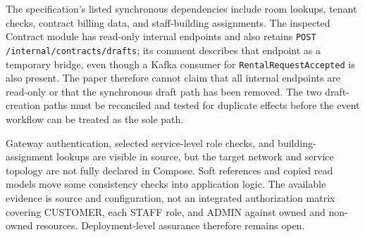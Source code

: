 The specification's listed synchronous dependencies include room lookups, tenant checks, contract billing data, and staff-building assignments. The inspected Contract module has read-only internal endpoints and also retains \texttt{POST /internal/contracts/drafts}; its comment describes that endpoint as a temporary bridge, even though a Kafka consumer for \texttt{RentalRequestAccepted} is also present. The paper therefore cannot claim that all internal endpoints are read-only or that the synchronous draft path has been removed. The two draft-creation paths must be reconciled and tested for duplicate effects before the event workflow can be treated as the sole path.

Gateway authentication, selected service-level role checks, and building-assignment lookups are visible in source, but the target network and service topology are not fully declared in Compose. Soft references and copied read models move some consistency checks into application logic. The available evidence is source and configuration, not an integrated authorization matrix covering CUSTOMER, each STAFF role, and ADMIN against owned and non-owned resources. Deployment-level assurance therefore remains open.
